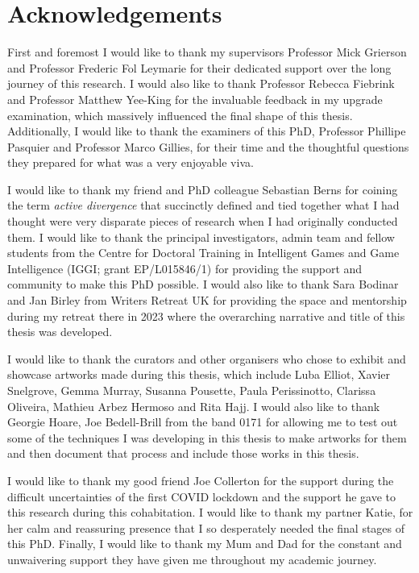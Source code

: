 \chapter*{Acknowledgements}

First and foremost I would like to thank my supervisors Professor Mick Grierson and Professor Frederic Fol Leymarie for their dedicated support over the long journey of this research. I would also like to thank Professor Rebecca Fiebrink and Professor Matthew Yee-King for the invaluable feedback in my upgrade examination, which massively influenced the final shape of this thesis. Additionally, I would like to thank the examiners of this PhD, Professor Phillipe Pasquier and Professor Marco Gillies, for their time and the thoughtful questions they prepared for what was a very enjoyable viva. 

I would like to thank my friend and PhD colleague Sebastian Berns for coining the term \textit{active divergence} that succinctly defined and tied together what I had thought were very disparate pieces of research when I had originally conducted them. I would like to thank the principal investigators, admin team and fellow students from the Centre for Doctoral Training in Intelligent Games and Game Intelligence (IGGI; grant EP/L015846/1) for providing the support and community to make this PhD possible. I would also like to thank Sara Bodinar and Jan Birley from Writers Retreat UK for providing the space and mentorship during my retreat there in 2023 where the overarching narrative and title of this thesis was developed. 

I would like to thank the curators and other organisers who chose to exhibit and showcase artworks made during this thesis, which include Luba Elliot, Xavier Snelgrove, Gemma Murray, Susanna Pousette, Paula Perissinotto, Clarissa Oliveira, Mathieu Arbez Hermoso and Rita Hajj. I would also like to thank Georgie Hoare, Joe Bedell-Brill from the band 0171 for allowing me to test out some of the techniques I was developing in this thesis to make artworks for them and then document that process and include those works in this thesis.

I would like to thank my good friend Joe Collerton for the support during the difficult uncertainties of the first COVID lockdown and the support he gave to this research during this cohabitation. I would like to thank my partner Katie, for her calm and reassuring presence that I so desperately needed the final stages of this PhD. Finally, I would like to thank my Mum and Dad for the constant and unwaivering support they have given me throughout my academic journey. 


